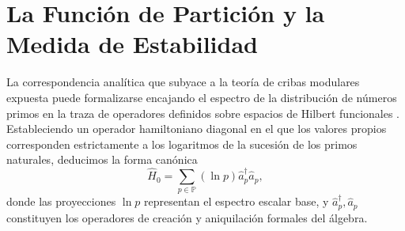 \documentclass{article}
\numberwithin{equation}{section}
\theoremstyle{plain}
\theoremstyle{definition}
\begin{document}
\begin{table}[h!]
\centering
\renewcommand{\arraystretch}{1.5}
\caption{Evolución asintótica de la sucesión de primoriales de Gauss. El Nivel 2 ($\Pi_2$) resalta analíticamente como el atractor estacionario óptimo que maximiza el cociente de filtrado frente a la divergencia combinatoria del grupo de clases.}
\label{tabla:primoriales_gauss}
\end{table}

\section{La Función de Partición y la Medida de Estabilidad}
\label{apendice:hamiltoniano_primones}

La correspondencia analítica que subyace a la teoría de cribas modulares expuesta puede formalizarse encajando el espectro de la distribución de números primos en la traza de operadores definidos sobre espacios de Hilbert funcionales \cite{Julia1990}. Estableciendo un operador hamiltoniano diagonal en el que los valores propios corresponden estrictamente a los logaritmos de la sucesión de los primos naturales, deducimos la forma canónica
\begin{equation}
    \hat{H}_0 = \sum_{p \in \mathbb{P}} (\ln p) \hat{a}_p^\dagger \hat{a}_p,
\end{equation}
donde las proyecciones $\ln p$ representan el espectro escalar base, y $\hat{a}_p^\dagger, \hat{a}_p$ constituyen los operadores de creación y aniquilación formales del álgebra.
\end{document}
